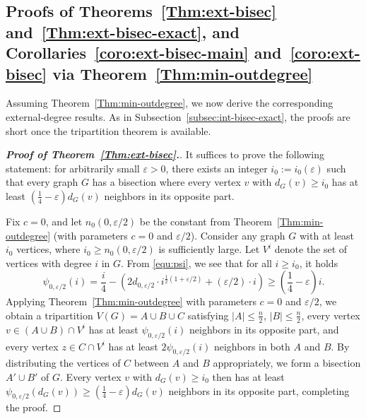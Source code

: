 \documentclass{aic}
\begin{document}
	\subsection{Proofs of Theorems~\ref{Thm:ext-bisec} and~\ref{Thm:ext-bisec-exact}, and Corollaries~\ref{coro:ext-bisec-main} and~\ref{coro:ext-bisec} via Theorem~\ref{Thm:min-outdegree}}\label{subsec:ext-bisec-exact}
	\noindent
	Assuming Theorem~\ref{Thm:min-outdegree}, we now derive the corresponding external-degree results.
	As in Subsection~\ref{subsec:int-bisec-exact}, the proofs are short once the tripartition theorem is available.
	
	\begin{proof}[\bf Proof of Theorem~\ref{Thm:ext-bisec}.]
		It suffices to prove the following statement: for arbitrarily small $\varepsilon>0$,
		there exists an integer $i_0:=i_0(\varepsilon)$ such that every graph $G$ has a bisection where every vertex $v$ with $d_G(v)\geq i_0$ has at least $\left(\frac{1}{4}-\varepsilon\right)d_G(v)$ neighbors in its opposite part.
		
		Fix $c=0$, and let $n_0(0,\varepsilon/2)$ be the constant from Theorem~\ref{Thm:min-outdegree} (with parameters $c=0$ and $\varepsilon/2$).
		Consider any graph $G$ with at least $i_0$ vertices, where $i_0\geq n_0(0,\varepsilon/2)$ is sufficiently large.
		Let $V^i$ denote the set of vertices with degree $i$ in $G$.
		From \eqref{equ:psi}, we see that for all $i\geq i_0$, it holds
		$$\psi_{0,\varepsilon/2}(i)=\frac{i}{4}-\left(2d_{0,\varepsilon/2}\cdot i^{\frac{1}{2}(1+\varepsilon/2)}+(\varepsilon/2)\cdot i\right)\geq \left(\frac{1}{4}-\varepsilon\right)i.$$
		Applying Theorem~\ref{Thm:min-outdegree} with parameters $c=0$ and $\varepsilon/2$, we obtain a tripartition $V(G)=A\cup B\cup C$ satisfying $|A|\leq \frac{n}{2}$, $|B|\leq \frac{n}{2}$,
		every vertex $v\in (A\cup B)\cap V^i$ has at least $\psi_{0,\varepsilon/2}(i)$ neighbors in its opposite part,
		and every vertex $z\in C\cap V^i$ has at least $2\psi_{0,\varepsilon/2}(i)$ neighbors in both $A$ and $B$.
		By distributing the vertices of $C$ between $A$ and $B$ appropriately, we form a bisection $A'\cup B'$ of $G$.
		Every vertex $v$ with $d_G(v)\geq i_0$ then has at least $\psi_{0,\varepsilon/2}(d_G(v))\geq \left(\frac{1}{4}-\varepsilon\right)d_G(v)$ neighbors in its opposite part, completing the proof.
	\end{proof}
	
\end{document}

